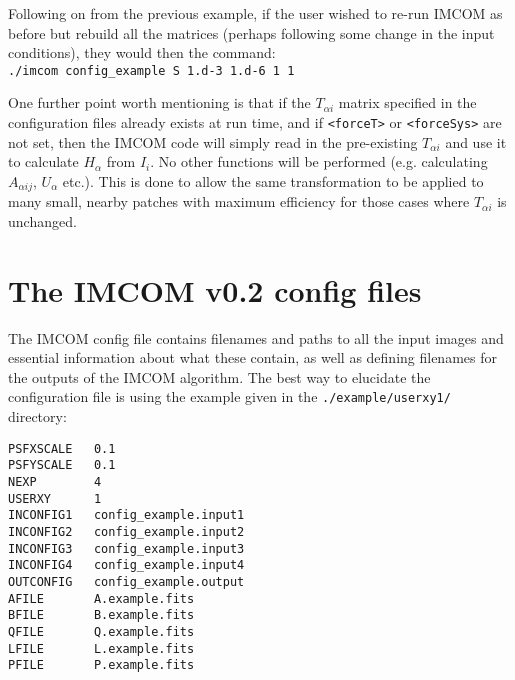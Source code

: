 \documentclass[10pt]{article}
\begin{document}
Following on from the previous example, if the user wished to re-run IMCOM as before but rebuild all the matrices (perhaps following some change in the input conditions), they would then the command:
\\ \newline
\texttt{./imcom config\_example S 1.d-3 1.d-6 1 1}
\newline

One further point worth mentioning is that if the $T_{\alpha i}$ matrix specified in the configuration files already exists at run time, and if \texttt{<forceT>} or \texttt{<forceSys>} are not set, then the IMCOM code will simply read in the pre-existing $T_{\alpha i}$ and use it to calculate $H_{\alpha}$ from $I_i$.  No other functions will be performed (e.g. calculating $A_{\alpha i j}$, $U_{\alpha}$ etc.).  This is done to allow the same transformation to be applied to many small, nearby patches with maximum efficiency for those cases where $T_{\alpha i }$ is unchanged.

\section{The IMCOM v0.2 config files}\label{sect:config}
The IMCOM config file contains filenames and paths to all the input images and essential information about what these contain, as well as defining filenames for the outputs of the IMCOM algorithm. 
The best way to elucidate the configuration file is using the example given in the \texttt{./example/userxy1/} directory:

\texttt{PSFXSCALE~~~0.1 \\
PSFYSCALE~~~0.1 \\
NEXP~~~~~~~~4 \\
USERXY~~~~~~1 \\
INCONFIG1~~~config\_example.input1 \\
INCONFIG2~~~config\_example.input2 \\
INCONFIG3~~~config\_example.input3 \\
INCONFIG4~~~config\_example.input4 \\
OUTCONFIG~~~config\_example.output \\
AFILE~~~~~~~A.example.fits \\
BFILE~~~~~~~B.example.fits \\
QFILE~~~~~~~Q.example.fits \\
LFILE~~~~~~~L.example.fits \\
PFILE~~~~~~~P.example.fits   }
\end{document}
